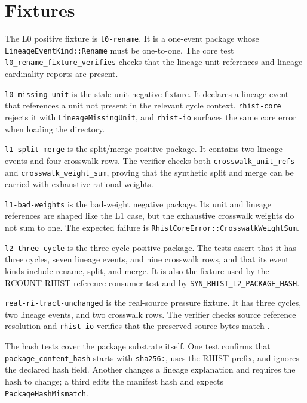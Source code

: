 \section{Fixtures}

The L0 positive fixture is \texttt{l0-rename}. It is a one-event package whose
\texttt{LineageEventKind::Rename} must be one-to-one. The core test
\texttt{l0\_rename\_fixture\_verifies} checks that the lineage unit references
and lineage cardinality reports are present.

\texttt{l0-missing-unit} is the stale-unit negative fixture. It declares a
lineage event that references a unit not present in the relevant cycle context.
\texttt{rhist-core} rejects it with \texttt{LineageMissingUnit}, and
\texttt{rhist-io} surfaces the same core error when loading the directory.

\texttt{l1-split-merge} is the split/merge positive package. It contains two
lineage events and four crosswalk rows. The verifier checks both
\texttt{crosswalk\_unit\_refs} and \texttt{crosswalk\_weight\_sum}, proving
that the synthetic split and merge can be carried with exhaustive rational
weights.

\texttt{l1-bad-weights} is the bad-weight negative package. Its unit and
lineage references are shaped like the L1 case, but the exhaustive crosswalk
weights do not sum to one. The expected failure is
\texttt{RhistCoreError::CrosswalkWeightSum}.

\texttt{l2-three-cycle} is the three-cycle positive package. The tests assert
that it has three cycles, seven lineage events, and nine crosswalk rows, and
that its event kinds include rename, split, and merge. It is also the fixture
used by the RCOUNT RHIST-reference consumer test and by
\texttt{SYN\_RHIST\_L2\_PACKAGE\_HASH}.

\texttt{real-ri-tract-unchanged} is the real-source pressure fixture. It has
three cycles, two lineage events, and two crosswalk rows. The verifier checks
source reference resolution and \texttt{rhist-io} verifies that the preserved
source bytes match .

The hash tests cover the package substrate itself. One test confirms that
\texttt{package\_content\_hash} starts with \texttt{sha256:}, uses the RHIST
prefix, and ignores the declared hash field. Another changes a lineage
explanation and requires the hash to change; a third edits the manifest hash
and expects \texttt{PackageHashMismatch}.
